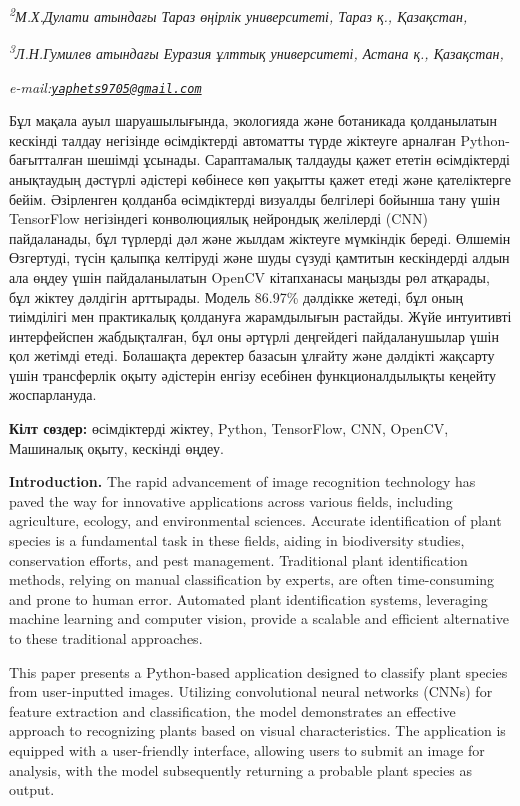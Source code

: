 \documentclass[
]{article}
\begin{document}
\emph{\textsuperscript{2}М.Х.Дулати атындағы Тараз өңірлік университеті,
Тараз қ., Қазақстан,}

\emph{\textsuperscript{3}Л.Н.Гумилев атындағы Еуразия ұлттық
университеті, Астана қ., Қазақстан,}

\emph{e-mail:\href{mailto:yaphets9705@gmail.com}{\nolinkurl{yaphets9705@gmail.com}}}

Бұл мақала ауыл шаруашылығында, экологияда және ботаникада қолданылатын
кескінді талдау негізінде өсімдіктерді автоматты түрде жіктеуге арналған
Python-бағытталған шешімді ұсынады. Сараптамалық талдауды қажет ететін
өсімдіктерді анықтаудың дәстүрлі әдістері көбінесе көп уақытты қажет
етеді және қателіктерге бейім. Әзірленген қолданба өсімдіктерді визуалды
белгілері бойынша тану үшін TensorFlow негізіндегі конволюциялық
нейрондық желілерді (CNN) пайдаланады, бұл түрлерді дәл және жылдам
жіктеуге мүмкіндік береді. Өлшемін Өзгертуді, түсін қалыпқа келтіруді
және шуды сүзуді қамтитын кескіндерді алдын ала өңдеу үшін
пайдаланылатын OpenCV кітапханасы маңызды рөл атқарады, бұл жіктеу
дәлдігін арттырады. Модель 86.97\% дәлдікке жетеді, бұл оның тиімділігі
мен практикалық қолдануға жарамдылығын растайды. Жүйе интуитивті
интерфейспен жабдықталған, бұл оны әртүрлі деңгейдегі пайдаланушылар
үшін қол жетімді етеді. Болашақта деректер базасын ұлғайту және дәлдікті
жақсарту үшін трансферлік оқыту әдістерін енгізу есебінен
функционалдылықты кеңейту жоспарлануда.

\textbf{Кілт сөздер:} өсімдіктерді жіктеу, Python, TensorFlow, CNN,
OpenCV, Машиналық оқыту, кескінді өңдеу.

\textbf{Introduction.} The rapid advancement of image recognition
technology has paved the way for innovative applications across various
fields, including agriculture, ecology, and environmental sciences.
Accurate identification of plant species is a fundamental task in these
fields, aiding in biodiversity studies, conservation efforts, and pest
management. Traditional plant identification methods, relying on manual
classification by experts, are often time-consuming and prone to human
error. Automated plant identification systems, leveraging machine
learning and computer vision, provide a scalable and efficient
alternative to these traditional approaches.

This paper presents a Python-based application designed to classify
plant species from user-inputted images. Utilizing convolutional neural
networks (CNNs) for feature extraction and classification, the model
demonstrates an effective approach to recognizing plants based on visual
characteristics. The application is equipped with a user-friendly
interface, allowing users to submit an image for analysis, with the
model subsequently returning a probable plant species as output.
\end{document}
